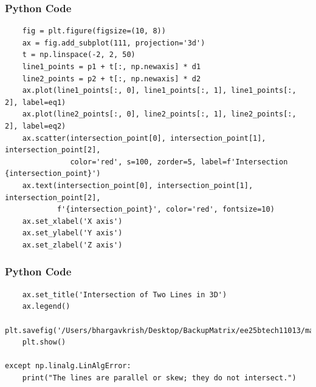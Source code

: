 \documentclass{beamer}
\begin{document}
\begin{frame}[fragile]
    \frametitle{Python Code}
    \begin{lstlisting}
    fig = plt.figure(figsize=(10, 8))
    ax = fig.add_subplot(111, projection='3d')
    t = np.linspace(-2, 2, 50)
    line1_points = p1 + t[:, np.newaxis] * d1
    line2_points = p2 + t[:, np.newaxis] * d2
    ax.plot(line1_points[:, 0], line1_points[:, 1], line1_points[:, 2], label=eq1)
    ax.plot(line2_points[:, 0], line2_points[:, 1], line2_points[:, 2], label=eq2)
    ax.scatter(intersection_point[0], intersection_point[1], intersection_point[2],
               color='red', s=100, zorder=5, label=f'Intersection {intersection_point}')
    ax.text(intersection_point[0], intersection_point[1], intersection_point[2],
            f'{intersection_point}', color='red', fontsize=10)
    ax.set_xlabel('X axis')
    ax.set_ylabel('Y axis')
    ax.set_zlabel('Z axis')

    \end{lstlisting}
\end{frame}

\begin{frame}[fragile]
    \frametitle{Python Code}
    \begin{lstlisting}
    ax.set_title('Intersection of Two Lines in 3D')
    ax.legend()
    plt.savefig('/Users/bhargavkrish/Desktop/BackupMatrix/ee25btech11013/matgeo/4.10.15/figs/Figure_1.png')
    plt.show()

except np.linalg.LinAlgError:
    print("The lines are parallel or skew; they do not intersect.")

    \end{lstlisting}
\end{frame}
    
\end{document}
